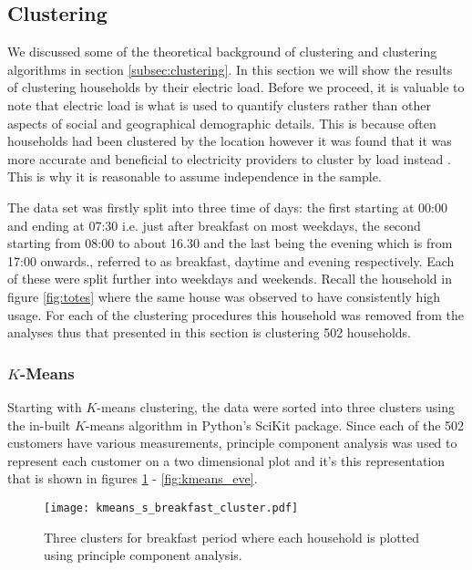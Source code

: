 \documentclass[a4paper]{article}
\begin{document}

\subsection{Clustering} \label{subsec:clus_res}
We discussed some of the theoretical background of clustering and clustering algorithms in section \ref{subsec:clustering}. In this section we will show the results of clustering households by their electric load. Before we proceed, it is valuable to note that electric load is what is used to quantify clusters rather than other aspects of social and geographical demographic details. This is because often households had been clustered by the location however it was found that it was more accurate and beneficial to electricity providers to cluster by load instead \citet{elexon}. This is why it is reasonable to assume independence in the sample.

The data set was firstly split into three time of days: the first starting at 00:00 and ending at 07:30 i.e. just after breakfast on most weekdays, the second starting from 08:00 to about 16.30 and the last being the evening which is from 17:00 onwards., referred to as breakfast, daytime and evening respectively. Each of these were split further into weekdays and weekends. Recall the household in figure \ref{fig:totes} where the same house was observed to have consistently high usage. For each of the clustering procedures this household was removed from the analyses thus that presented in this section is clustering 502 households.
\subsubsection{$K$-Means} \label{subsubsec:kmeans_res} 

Starting with $K$-means clustering, the data were sorted into three clusters using the in-built $K$-means algorithm in Python's SciKit package. Since each of the 502 customers have various measurements, principle component analysis was used to represent each customer on a two dimensional plot and it's this representation that is shown in figures \ref{fig:kmeans_break} - \ref{fig:kmeans_eve}.

\begin{figure}
\centering
\texttt{[image: kmeans\_s\_breakfast\_cluster.pdf]}
\caption{\label{fig:kmeans_break}Three clusters for breakfast period where each household is plotted using principle component analysis.}
\end{figure}
\end{document}
